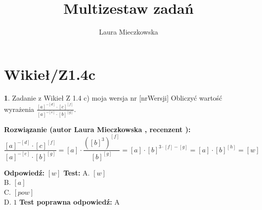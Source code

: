 \documentclass[12pt, a4paper]{article}
\title{Multizestaw zadań}
\author{Laura Mieczkowska}
\date{}
\theoremstyle{definition} %
\newtheorem{zad}{}
\newcommand{\kategoria}[1]{\section{#1}} %
\newcommand{\zadStart}[1]{\begin{zad}#1\newline} %
\newcommand{\zadStop}{\end{zad}}   %
\newcommand{\rozwStart}[2]{\noindent \textbf{Rozwiązanie (autor #1 , recenzent #2): }\newline} %
\newcommand{\odpStart}{\noindent \textbf{Odpowiedź:}\newline}    %
\newcommand{\odpStop}{\newline}                                             %
\newcommand{\testStart}{\noindent \textbf{Test:}\newline} %
\newcommand{\testStop}{\newline} %
\newcommand{\kluczStart}{\noindent \textbf{Test poprawna odpowiedź:}\newline} %
\newcommand{\kluczStop}{\newline} %
\begin{document}
\maketitle


\kategoria{Wikieł/Z1.4c}
\zadStart{Zadanie z Wikieł Z 1.4 c) moja wersja nr [nrWersji]}
Obliczyć wartość wyrażenia $\frac{[a]^{-[d]}\cdot[c]^{[f]}}{[a]^{-[e]}\cdot[b]^{[g]}}$.
\zadStop
\rozwStart{Laura Mieczkowska}{}
$$\frac{[a]^{-[d]}\cdot[c]^{[f]}}{[a]^{-[e]}\cdot[b]^{[g]}}=[a]\cdot \frac{([b]^3)^{[f]}}{[b]^{[g]}}=[a]\cdot[b]^{3\cdot[f]-[g]}=[a]\cdot[b]^{[h]}=[w]$$


\odpStart
$[w]$
\odpStop
\testStart
A. $[w]$ \\
B. $[a]$ \\
C. $[pow]$ \\
D. $1$ 
\testStop
\kluczStart
A
\kluczStop
\end{document}
